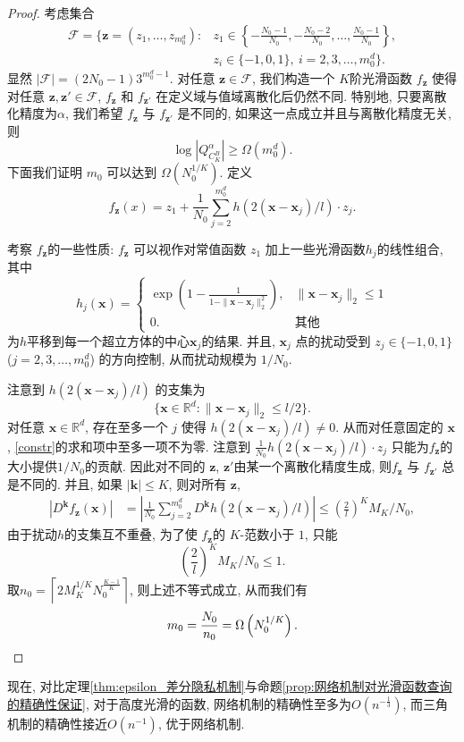 \begin{proof}
考虑集合
\begin{align*}
  \mathcal{F} = \Biggl\{\mathbf{z}=(z_1,\ldots,z_{m_0^d})\colon &z_1 \in \left\{-\frac{N_0-1}{N_0},-\frac{N_0-2}{N_0},\ldots,\frac{N_0-1}{N_0} \right\}, \\
  &z_i \in \{-1,0,1\},~i=2,3,\ldots,m_0^d \Biggr\}.
\end{align*}
显然 $|\mathcal{F}| = (2N_0-1) 3^{m_0^d-1}$. 对任意 $\mathbf{z} \in \mathcal{F}$, 我们构造一个 $K$阶光滑函数 $f_{\mathbf{z}}$ 使得对任意 $\mathbf{z},\mathbf{z}' \in \mathcal{F}$, $f_{\mathbf{z}}$ 和 $f_{\mathbf{z}'}$ 在定义域与值域离散化后仍然不同. 特别地, 只要离散化精度为$\alpha$, 我们希望 $f_\mathbf{z}$ 与 $f_{\mathbf{z}'}$ 是不同的, 如果这一点成立并且与离散化精度无关, 则
\[
\log \left|Q_{C_K^B}^{\alpha} \right| \ge \Omega(m_0^d).
\]
下面我们证明 $m_0$ 可以达到 $\Omega \left(N_0^{1/K} \right)$. 定义
\begin{equation*}
\label{constr}
f_{\mathbf{z}}(x) = z_1 + \frac{1}{N_0}\sum_{j=2}^{m_0^d} h\left(2(\mathbf{x}-\mathbf{x}_j)/l \right)\cdot z_j.
\end{equation*}

考察 $f_{\mathbf{z}}$的一些性质: $f_{\mathbf{z}}$ 可以视作对常值函数 $z_1$ 加上一些光滑函数$h_j$的线性组合, 其中\[
  h_j(\mathbf{x}) = \begin{cases} \exp \left(1-\frac{1}{1-\|\mathbf{x} - \mathbf{x}_j\|_2^2} \right),& \|\mathbf{x} - \mathbf{x}_j \|_2 \leq 1 \\ 0.& \text{其他} \end{cases}
\]为$h$平移到每一个超立方体的中心$\mathbf{x}_j$的结果. 并且, $\mathbf{x}_j$ 点的扰动受到 $z_j \in \{-1,0,1\}$ ($j=2,3,\ldots,m_0^d$) 的方向控制, 从而扰动规模为 $1/N_0$.

注意到 $h(2(\mathbf{x}-\mathbf{x}_j)/l)$ 的支集为
\[
\{\mathbf{x}\in \mathbb{R}^d: \|\mathbf{x}-\mathbf{x}_j\|_2 \leq l/2 \}.
\]
对任意 $\mathbf{x}\in \mathbb{R}^d$, 存在至多一个 $j$ 使得 $h(2(\mathbf{x}-\mathbf{x}_j)/l)\neq 0$. 从而对任意固定的 $\mathbf{x}$, \eqref{constr}的求和项中至多一项不为零. 注意到 $\frac{1}{N_0} h\left(2(\mathbf{x}-\mathbf{x}_j)/l \right)\cdot z_j$ 只能为$f_{\mathbf{z}}$的大小提供$1/N_0$的贡献. 因此对不同的 $\mathbf{z}$, $\mathbf{z}'$由某一个离散化精度生成, 则$f_{\mathbf{z}}$ 与 $f_{\mathbf{z}'}$ 总是不同的. 并且, 如果 $|\mathbf{k}| \le K$, 则对所有 $\mathbf{z}$,
\begin{align*}
|D^{\mathbf{k}} f_{\mathbf{z}}(\mathbf{x})| &= \left|\frac{1}{N_0}  \sum_{j=2}^{m_0^d} D^{\mathbf{k}} h(2(\mathbf{x}-\mathbf{x}_j)/l) \right|\leq \left(\frac{2}{l} \right)^K M_K/N_0,
\end{align*}
由于扰动$h$的支集互不重叠, 为了使 $f_{\mathbf{z}}$的 $K$-范数小于 $1$, 只能
\begin{equation*}
\left(\frac{2}{l} \right)^K M_K/N_0 \le 1.
\end{equation*}
取$n_0 =  \left\lceil 2M_K^{1/K}N_0^{\frac{K-1}{K}} \right\rceil$, 则上述不等式成立, 从而我们有
\[
m_0 = \frac{N_0}{n_0} = \Omega \left(N_0^{1/K} \right). \qedhere
\]
\end{proof}
现在, 对比定理\ref{thm:epsilon_差分隐私机制}与命题\ref{prop:网络机制对光滑函数查询的精确性保证}, 对于高度光滑的函数, 网络机制的精确性至多为$O\left(n^{-\frac{1}{3}}\right)$, 而三角机制的精确性接近$O\left(n^{-1}\right)$, 优于网络机制. 

